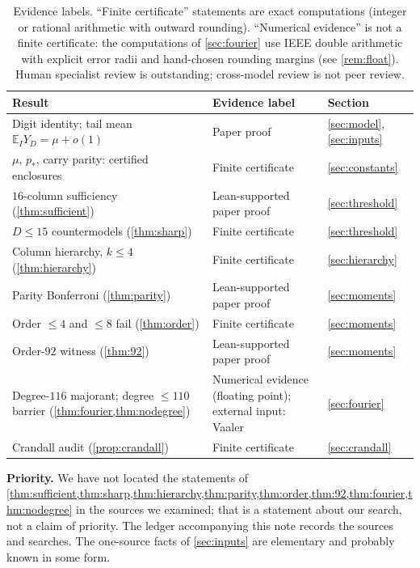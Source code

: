 \documentclass[11pt]{article}
\newcommand{\Av}{\mathbb E}
\begin{document}
\begin{table}[t]
\centering\small
\begin{tabular}{@{}p{}p{}l@{}}
\toprule
Result & Evidence label & Section\\
\midrule
Digit identity; tail mean $\Av_IY_D=\mu+o(1)$ & Paper proof & \ref{sec:model}, \ref{sec:inputs}\\
$\mu$, $p_*$, carry parity: certified enclosures & Finite certificate & \ref{sec:constants}\\
$16$-column sufficiency (\cref{thm:sufficient}) & Lean-supported paper proof & \ref{sec:threshold}\\
$D\le15$ countermodels (\cref{thm:sharp}) & Finite certificate & \ref{sec:threshold}\\
Column hierarchy, $k\le4$ (\cref{thm:hierarchy}) & Finite certificate & \ref{sec:hierarchy}\\
Parity Bonferroni (\cref{thm:parity}) & Lean-supported paper proof & \ref{sec:moments}\\
Order $\le4$ and $\le8$ fail (\cref{thm:order}) & Finite certificate & \ref{sec:moments}\\
Order-$92$ witness (\cref{thm:92}) & Lean-supported paper proof & \ref{sec:moments}\\
Degree-$116$ majorant; degree $\le110$ barrier (\cref{thm:fourier,thm:nodegree}) & Numerical evidence (floating point); external input: Vaaler & \ref{sec:fourier}\\
Crandall audit (\cref{prop:crandall}) & Finite certificate & \ref{sec:crandall}\\
\bottomrule
\end{tabular}
\caption{Evidence labels. ``Finite certificate'' statements are exact computations (integer or rational arithmetic with outward rounding). ``Numerical evidence'' is not a finite certificate: the computations of \cref{sec:fourier} use IEEE double arithmetic with explicit error radii and hand-chosen rounding margins (see \cref{rem:float}). Human specialist review is outstanding; cross-model review is not peer review.}\label{tab:summary}
\end{table}

\medskip\noindent\textbf{Priority.} We have not located the statements of \cref{thm:sufficient,thm:sharp,thm:hierarchy,thm:parity,thm:order,thm:92,thm:fourier,thm:nodegree} in the sources we examined; that is a statement about our search, not a claim of priority. The ledger accompanying this note records the sources and searches. The one-source facts of \cref{sec:inputs} are elementary and probably known in some form.
\end{document}
